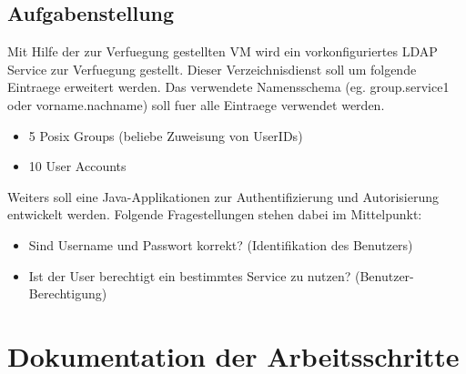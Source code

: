 \documentclass[letterpaper, 12pt]{article}
\let\tempsection\section
\renewcommand\section[1]{\vspace{-0.3cm}\tempsection{#1}\vspace{-0.3cm}}
\let\tempsubsection\subsection
\renewcommand\subsection[1]{\vspace{0cm}\tempsubsection{#1}\vspace{0cm}}
\begin{document}
\subsection{Aufgabenstellung}
Mit Hilfe der zur Verfuegung gestellten VM wird ein vorkonfiguriertes LDAP Service zur Verfuegung gestellt. Dieser Verzeichnisdienst soll um folgende Eintraege erweitert werden. Das verwendete Namensschema (eg. group.service1 oder vorname.nachname) soll fuer alle Eintraege verwendet werden.
\begin{itemize}
	\item 5 Posix Groups (beliebe Zuweisung von UserIDs)
	\item 10 User Accounts
\end{itemize}
Weiters soll eine Java-Applikationen zur Authentifizierung und Autorisierung entwickelt werden. Folgende Fragestellungen stehen dabei im Mittelpunkt:
\begin{itemize}
	\item Sind Username und Passwort korrekt? 
(Identifikation des Benutzers)
	\item Ist der User berechtigt ein bestimmtes Service zu nutzen?
(Benutzer-Berechtigung)
\end{itemize}
\newpage

\section{Dokumentation der Arbeitsschritte}
\end{document}
